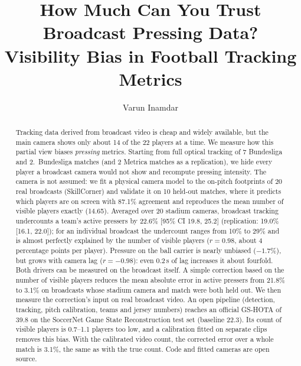 \documentclass[runningheads]{llncs}
\begin{document}
\title{How Much Can You Trust Broadcast Pressing Data?\\
Visibility Bias in Football Tracking Metrics}

\author{Varun Inamdar}

\maketitle

\begin{abstract}
Tracking data derived from broadcast video is cheap and widely available, but the main camera shows only about
14 of the 22 players at a time. We measure how this partial view biases \emph{pressing} metrics. Starting from full
optical tracking of 7 Bundesliga and 2.~Bundesliga matches (and 2 Metrica matches as a replication), we hide every
player a broadcast camera would not show and recompute pressing intensity. The camera is not assumed: we fit a
physical camera model to the on-pitch footprints of 20 real broadcasts (SkillCorner) and validate it on 10 held-out
matches, where it predicts which players are on screen with 87.1\% agreement and reproduces the mean number of
visible players exactly (14.65). Averaged over 20 stadium cameras, broadcast tracking undercounts a team's active
pressers by 22.6\% [95\% CI 19.8, 25.2] (replication: 19.0\% [16.1, 22.0]); for an individual broadcast the
undercount ranges from 10\% to 29\% and is almost perfectly explained by the number of visible players
($r = 0.98$, about 4 percentage points per player). Pressure on the ball carrier is nearly unbiased
($-1.7\%$), but grows with camera lag ($r = -0.98$): even 0.2\,s of lag increases it about fourfold. Both drivers
can be measured on the broadcast itself. A simple correction based on the number of visible players reduces the mean
absolute error in active pressers from 21.8\% to 3.1\% on broadcasts whose stadium camera and match were both held
out. We then measure the correction's input on real broadcast video. An open pipeline (detection, tracking, pitch
calibration, teams and jersey numbers) reaches an official GS-HOTA of 39.8 on the SoccerNet Game State Reconstruction
test set (baseline 22.3). Its count of visible players is 0.7--1.1 players too low, and a calibration fitted on
separate clips removes this bias. With the calibrated video count, the corrected error over a whole match is 3.1\%,
the same as with the true count. Code and fitted cameras are open source.
\end{abstract}
\end{document}
